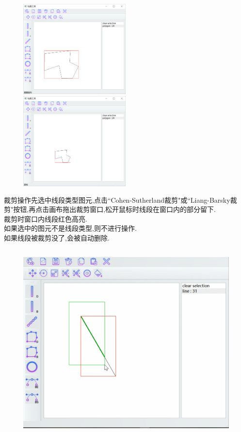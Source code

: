 \documentclass[a4paper,UTF8]{article}
\theoremstyle{definition}
\begin{document}
\begin{figure}[H]
	\centering
	\begin{minipage}[t]{0.5\linewidth}
		\includegraphics[width=2.2in]{scale1.png}
	\end{minipage}%
	\begin{minipage}[t]{0.5\linewidth}
		\includegraphics[width=2.2in]{scale2.png}
	\end{minipage}
\end{figure}
裁剪操作先选中线段类型图元,点击``Cohen-Sutherland裁剪"或``Liang-Barsky裁剪"按钮,再点击画布拖出裁剪窗口,松开鼠标时线段在窗口内的部分留下.\\
\indent 裁剪时窗口内线段红色高亮.\\
\indent 如果选中的图元不是线段类型,则不进行操作.\\
\indent 如果线段被裁剪没了,会被自动删除.
\begin{figure}[H]
	\includegraphics[width=5in,height=4in]{clip.png}
\end{figure}
\end{document}
